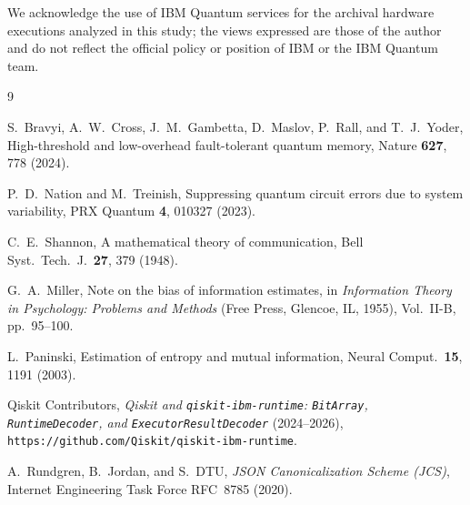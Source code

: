 \documentclass[twocolumn,aps,prapplied,superscriptaddress,floatfix]{revtex4-2}
\begin{document}
\begin{acknowledgments}
We acknowledge the use of IBM Quantum services for the archival hardware executions analyzed in this study; the views expressed are those of the author and do not reflect the official policy or position of IBM or the IBM Quantum team.
\end{acknowledgments}

\begin{thebibliography}{9}

S.~Bravyi, A.~W.~Cross, J.~M.~Gambetta, D.~Maslov, P.~Rall, and T.~J.~Yoder, High-threshold and low-overhead fault-tolerant quantum memory, Nature \textbf{627}, 778 (2024).

P.~D.~Nation and M.~Treinish, Suppressing quantum circuit errors due to system variability, PRX Quantum \textbf{4}, 010327 (2023).

C.~E.~Shannon, A mathematical theory of communication, Bell Syst.\ Tech.\ J.\ \textbf{27}, 379 (1948).

G.~A.~Miller, Note on the bias of information estimates, in \emph{Information Theory in Psychology: Problems and Methods} (Free Press, Glencoe, IL, 1955), Vol.~II-B, pp.~95--100.

L.~Paninski, Estimation of entropy and mutual information, Neural Comput.\ \textbf{15}, 1191 (2003).

Qiskit Contributors, \emph{Qiskit and \texttt{qiskit-ibm-runtime}: \texttt{BitArray}, \texttt{RuntimeDecoder}, and \texttt{ExecutorResultDecoder}} (2024--2026), \texttt{https://github.com/Qiskit/qiskit-ibm-runtime}.

A.~Rundgren, B.~Jordan, and S.~DTU, \emph{JSON Canonicalization Scheme (JCS)}, Internet Engineering Task Force RFC~8785 (2020).

\end{thebibliography}
\end{document}
